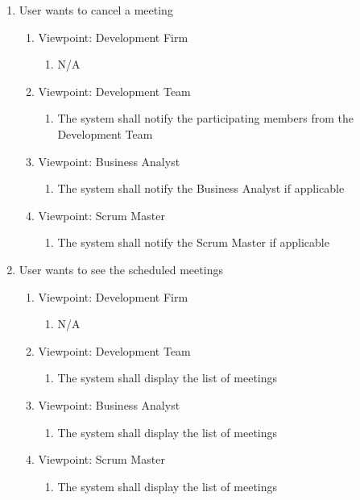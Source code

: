 \documentclass[12pt, titlepage]{article}
\begin{document}
\begin{enumerate}[{BE}1.]
    \item User wants to cancel a meeting %
    \begin{enumerate}[{VP}1.] 
        \item Viewpoint: Development Firm
            \begin{enumerate}
                \item[] N/A
            \end{enumerate}
        \item Viewpoint: Development Team
            \begin{enumerate}
                \item The system shall notify the participating members from the Development Team
            \end{enumerate}
        \item Viewpoint: Business Analyst
            \begin{enumerate}
                \item The system shall notify the Business Analyst if applicable
            \end{enumerate}
        \item Viewpoint: Scrum Master
            \begin{enumerate}
                \item The system shall notify the Scrum Master if applicable
            \end{enumerate}
    \end{enumerate}
    
    \item User wants to see the scheduled meetings
    \begin{enumerate}[{VP}1.] 
        \item Viewpoint: Development Firm
            \begin{enumerate}
                \item[] N/A
            \end{enumerate}
        \item Viewpoint: Development Team
            \begin{enumerate}
                \item The system shall display the list of meetings
            \end{enumerate}
        \item Viewpoint: Business Analyst
            \begin{enumerate}
                \item The system shall display the list of meetings
            \end{enumerate}
        \item Viewpoint: Scrum Master
            \begin{enumerate}
                \item The system shall display the list of meetings
            \end{enumerate}
    \end{enumerate}
    

\end{enumerate}
\end{document}
